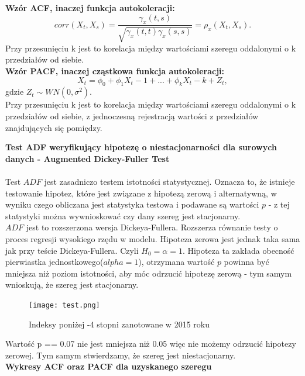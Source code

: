 \documentclass[12pt]{mwart}
\begin{document}
\noindent \textbf{Wzór ACF, inaczej funkcja autokoleracji:}
$$ corr(X_t, X_s) = \frac{ \gamma_x(t,s)}{\sqrt{\gamma_x(t,t) \gamma_x(s,s)}} = \rho_x(X_t, X_s).$$
Przy przesunięciu k jest to korelacja między wartościami szeregu oddalonymi o k przedziałów od siebie.\\


\noindent \textbf{Wzór PACF, inaczej cząstkowa funkcja autokoleracji:}
$$ X_t = \phi_0 + \phi_1 X_t-1 + ... + \phi_k X_t-k + Z_t,$$
gdzie ${Z_t} \sim WN(0, \sigma^2).$\\
Przy przesunięciu k jest to korelacja między wartościami szeregu oddalonymi o k przedziałów od siebie, z jednoczesną rejestracją wartości z przedziałów znajdujących się pomiędzy.
\newpage

\large\textbf{Test ADF weryfikujący hipotezę o niestacjonarności dla surowych danych - Augmented Dickey-Fuller Test}\\
\\
Test $ADF$ jest zasadniczo testem istotności statystycznej. Oznacza to, że istnieje testowanie hipotez, które jest związane z hipotezą zerową i alternatywną, w wyniku czego obliczana jest statystyka testowa i podawane są wartości $p$ - z tej statystyki można wywnioskować czy dany szereg jest stacjonarny. \\
$ADF$ jest to rozszerzona wersja Dickeya-Fullera. Rozszerza równanie testy o proces regresji wysokiego rzędu w modelu. Hipoteza zerowa jest jednak taka sama jak przy teście Dickeya-Fullera. Czyli $H_0 = \alpha =1 $. Hipoteza ta zakłada obecność pierwiastka jednostkowego($alpha=1$), otrzymana wartość $p$ powinna być mniejsza niż poziom istotności, aby móc odrzucić hipotezę zerową - tym samym wnioskują, że szereg jest stacjonarny. \\
\begin{figure}[h]
	
	\texttt{[image: test.png]}
	\caption{Indeksy poniżej -4 stopni zanotowane w 2015 roku}
\end{figure}

Wartość p == 0.07 nie jest mniejsza niż 0.05 więc nie możemy odrzucić hipotezy zerowej. Tym samym stwierdzamy, że szereg jest niestacjonarny.\\

\newpage
\large\textbf{Wykresy ACF oraz PACF dla uzyskanego szeregu}
\end{document}
